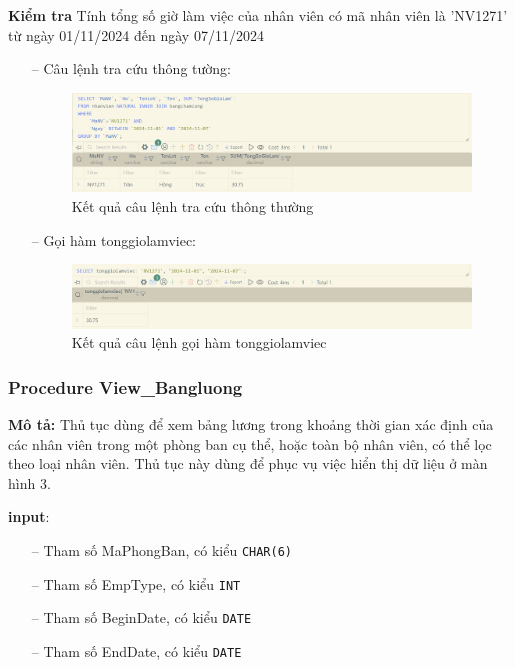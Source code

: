 \textbf{Kiểm tra} Tính tổng số giờ làm việc của nhân viên có mã nhân viên là 'NV1271' từ ngày 01/11/2024 đến ngày 07/11/2024
\begin{itemize}
    \item [--] Câu lệnh tra cứu thông tường:
    \begin{figure}[H]
        \centering
        \includegraphics[width=\linewidth]{./content/images/extra_0.png}
        \caption{Kết quả câu lệnh tra cứu thông thường}
        \label{fig:extra_0}
    \end{figure}
    \item [--] Gọi hàm tonggiolamviec:
    \begin{figure}[H]
        \centering
        \includegraphics[width=\linewidth]{./content/images/extra_1.png}
        \caption{Kết quả câu lệnh gọi hàm tonggiolamviec}
        \label{fig:extra_1}
    \end{figure}
\end{itemize}

\newpage
\subsubsection{Procedure View\_Bangluong}
\textbf{Mô tả:} Thủ tục dùng để xem bảng lương trong khoảng thời gian xác định của các nhân viên trong một phòng ban cụ thể, hoặc toàn bộ nhân viên, có thể lọc theo loại nhân viên. Thủ tục này dùng để phục vụ việc hiển thị dữ liệu ở màn hình 3.

\textbf{input}:
\begin{itemize}
    \item [--] Tham số MaPhongBan, có kiểu \texttt{CHAR(6)}
    \item [--] Tham số EmpType, có kiểu \texttt{INT}
    \item [--] Tham số BeginDate, có kiểu \texttt{DATE}
    \item [--] Tham số EndDate, có kiểu \texttt{DATE}
\end{itemize}

